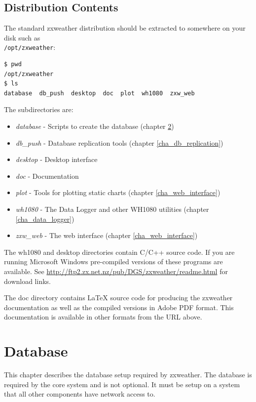 \documentclass[a4paper,10pt,draft]{book}
\begin{document}
\section{Distribution Contents}
The standard zxweather distribution should be extracted to somewhere on your disk such as \\ \verb|/opt/zxweather|:

\begin{verbatim}
$ pwd
/opt/zxweather
$ ls
database  db_push  desktop  doc  plot  wh1080  zxw_web
\end{verbatim}

The subdirectories are:

\begin{itemize}
\item \emph{database} - Scripts to create the database (chapter \ref{cha_database})
\item \emph{db\_push} - Database replication tools (chapter \ref{cha_db_replication})
\item \emph{desktop}  - Desktop interface
\item \emph{doc} - Documentation
\item \emph{plot} - Tools for plotting static charts (chapter \ref{cha_web_interface})
\item \emph{wh1080} - The Data Logger and other WH1080 utilities (chapter \ref{cha_data_logger})
\item \emph{zxw\_web} - The web interface (chapter \ref{cha_web_interface})
\end{itemize}

The wh1080 and desktop directories contain C/C++ source code. If you are running Microsoft Windows pre-compiled versions of these programs are available. See \url{http://ftp2.zx.net.nz/pub/DGS/zxweather/readme.html} for download links.

The doc directory contains \LaTeX{} source code for producing the zxweather documentation as well as the compiled versions in Adobe PDF format. This documentation is available in other formats from the URL above.

\chapter{Database}
\label{cha_database}

This chapter describes the database setup required by zxweather. The database is required by the core system and is not optional. It must be setup on a system that all other components have network access to.
\end{document}
